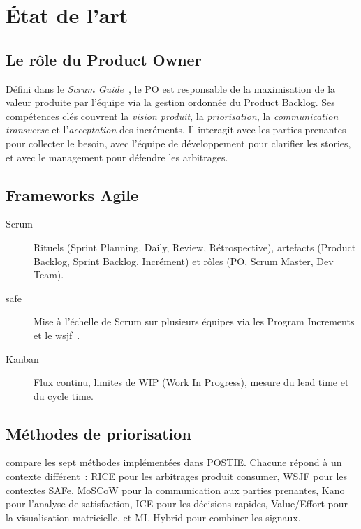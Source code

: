 \chapter{État de l'art}
\label{ch:sota}

\section{Le rôle du Product Owner}
Défini dans le \textit{Scrum Guide}~\cite{schwaber2020scrum}, le PO est
responsable de la maximisation de la valeur produite par l'équipe via
la gestion ordonnée du Product Backlog. Ses compétences clés couvrent
la \emph{vision produit}, la \emph{priorisation}, la \emph{communication
transverse} et l'\emph{acceptation} des incréments. Il interagit avec
les parties prenantes pour collecter le besoin, avec l'équipe de
développement pour clarifier les stories, et avec le management pour
défendre les arbitrages.

\section{Frameworks Agile}
\begin{description}
  \item[Scrum] Rituels (Sprint Planning, Daily, Review, Rétrospective),
        artefacts (Product Backlog, Sprint Backlog, Incrément) et rôles
        (PO, Scrum Master, Dev Team).
  \item[\gls{safe}] Mise à l'échelle de Scrum sur plusieurs équipes via
        les Program Increments et le \gls{wsjf}~\cite{leffingwell2018safe}.
  \item[Kanban] Flux continu, limites de WIP (Work In Progress), mesure
        du lead time et du cycle time.
\end{description}

\section{Méthodes de priorisation}
 compare les sept méthodes implémentées dans
POSTIE. Chacune répond à un contexte différent~: RICE pour les
arbitrages produit consumer, WSJF pour les contextes SAFe, MoSCoW
pour la communication aux parties prenantes, Kano pour l'analyse de
satisfaction, ICE pour les décisions rapides, Value/Effort pour la
visualisation matricielle, et ML Hybrid pour combiner les signaux.

